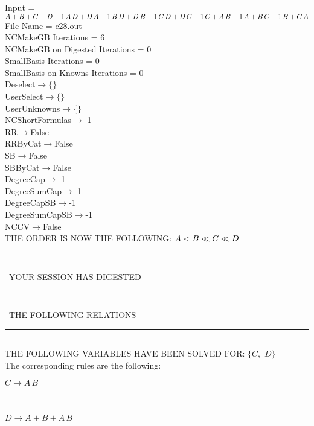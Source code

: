 \documentclass[rep10,leqno]{report}
\begin{document}
\normalsize
\baselineskip=12pt
\noindent
Input = 
$
\\A + B + C - D\\
-1\,
 A\,
 D + D\,
 A\\
-1\,
 B\,
 D + D\,
 B\\
-1\,
 C\,
 D + D\,
 C\\
-1\,
 C + A\,
 B\\
-1\,
 A + B\,
 C\\
-1\,
 B + C\,
 A\\
$
File Name = c28.out\\
NCMakeGB Iterations = 6\\
NCMakeGB on Digested Iterations = 0\\
SmallBasis Iterations = 0\\
SmallBasis on Knowns Iterations = 0\\
Deselect$\rightarrow \{\}$\\
UserSelect$\rightarrow \{\}$\\
UserUnknowns$\rightarrow \{\}$\\
NCShortFormulas$\rightarrow$-1\\
RR$\rightarrow $False\\
RRByCat$\rightarrow $False\\
SB$\rightarrow $False\\
SBByCat$\rightarrow $False\\
DegreeCap$\rightarrow $-1\\
DegreeSumCap$\rightarrow $-1\\
DegreeCapSB$\rightarrow $-1\\
DegreeSumCapSB$\rightarrow $-1\\
NCCV$\rightarrow $False\\
THE ORDER IS NOW THE FOLLOWING:\hfil\break
$
A<B\ll
C\ll
D\\
$
\rule[2pt]{6in}{4pt}\hfil\break
\rule[2pt]{1.879in}{4pt}
\ YOUR SESSION HAS DIGESTED\ 
\rule[2pt]{1.879in}{4pt}\hfil\break
\rule[2pt]{1.923in}{4pt}
\ THE FOLLOWING RELATIONS\ 
\rule[2pt]{1.923in}{4pt}\hfil\break
\rule[2pt]{6in}{4pt}\hfil\break
THE FOLLOWING VARIABLES HAVE BEEN SOLVED FOR:\hfil\break
$\{C,
$ $
D\}$
\smallskip\\
The corresponding rules are the following:\smallskip\\
\begin{minipage}{6in}
$
C\rightarrow A\,
 B
$
\end{minipage}\medskip\\
\begin{minipage}{6in}
$
D\rightarrow A + B + A\,
 B
$
\end{minipage}\medskip\\
\end{document}
